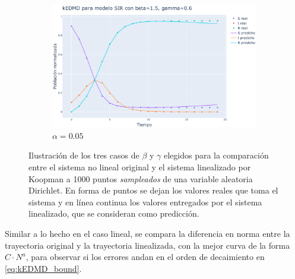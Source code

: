 \begin{figure}[htbp]
\begin{subfigure}[b]{0.32\textwidth}
        \label{fig:image2}
    \end{subfigure}
    \hfill
    \begin{subfigure}[b]{0.32\textwidth}
        \centering
        \includegraphics[width=\textwidth]{img/content/chapter3/SIR3.pdf}
        \caption{$\alpha=0.05$}
    \end{subfigure}
    \caption{Ilustración de los tres casos de $\beta$ y $\gamma$ elegidos para la comparación entre el sistema no lineal original y el sistema linealizado por Koopman a 1000 puntos \textit{sampleados} de una variable aleatoria Dirichlet. En forma de puntos se dejan los valores reales que toma el sistema y en línea continua los valores entregados por el sistema linealizado, que se consideran como predicción.}
    \label{fig:Comp_traj_SIR}
\end{figure}
Similar a lo hecho en el caso lineal, se compara la diferencia en norma entre la trayectoria original y la trayectoria linealizada, con la mejor curva de la forma $C \cdot N^{a}$, para observar si los errores andan en el orden de decaimiento en \eqref{eq:kEDMD_bound}.
